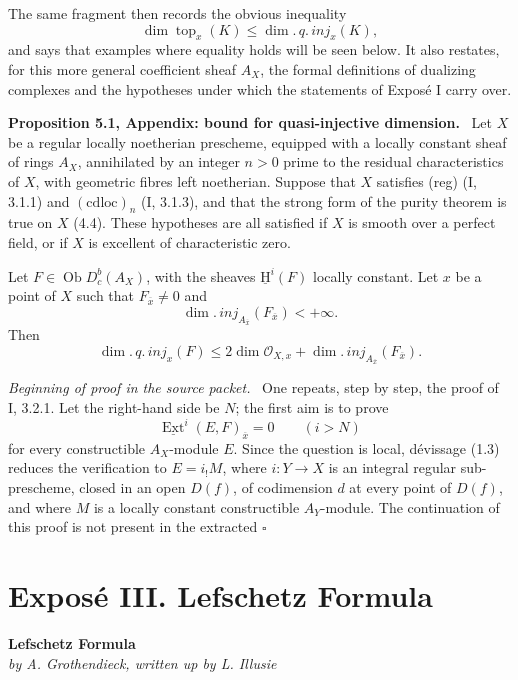 \documentclass[12pt]{article}
\newcommand{\Ext}{\operatorname{Ext}}
\newcommand{\ob}{\operatorname{Ob}}
\newcommand{\cO}{\mathcal O}
\newcommand{\ol}[1]{\overline{#1}}
\newcommand{\uH}{\underline{\mathrm H}}
\newcommand{\uExt}{\underline{\Ext}}
\newcommand{\qedtext}{\hfill$\square$}
\newenvironment{statement}[1]{\par\medskip\noindent\textbf{#1.}\ }{\par\medskip}
\newenvironment{prooftext}[1][Proof]{\par\noindent\emph{#1.}\ }{\par\medskip}
\begin{document}
The same fragment then records the obvious inequality
\[
   \dim\operatorname{top}_x(K)\le \dim.\,q.\,inj_x(K),
\]
and says that examples where equality holds will be seen below. It also restates, for this more general coefficient sheaf $A_X$, the formal definitions of dualizing complexes and the hypotheses under which the statements of Exposé I carry over.

\begin{statement}{Proposition 5.1, Appendix: bound for quasi-injective dimension}
Let $X$ be a regular locally noetherian prescheme, equipped with a locally constant sheaf of rings $A_X$, annihilated by an integer $n>0$ prime to the residual characteristics of $X$, with geometric fibres left noetherian. Suppose that $X$ satisfies (reg) (I, 3.1.1) and $(\mathrm{cdloc})_n$ (I, 3.1.3), and that the strong form of the purity theorem is true on $X$ (4.4). These hypotheses are all satisfied if $X$ is smooth over a perfect field, or if $X$ is excellent of characteristic zero.

Let $F\in\ob D_c^b(A_X)$, with the sheaves $\uH^i(F)$ locally constant. Let $x$ be a point of $X$ such that $F_{\ol x}\ne0$ and
\[
   \dim.\,inj_{A_{\ol x}}(F_{\ol x})<+\infty.
\]
Then
\[
   \dim.\,q.\,inj_x(F)
      \le 2\dim\cO_{X,x}+\dim.\,inj_{A_{\ol x}}(F_{\ol x}).
\]
\end{statement}

\begin{prooftext}[Beginning of proof in the source packet]
One repeats, step by step, the proof of I, 3.2.1. Let the right-hand side be $N$; the first aim is to prove
\[
   \uExt^i(E,F)_{\ol x}=0
      \qquad(i>N)
\]
for every constructible $A_X$-module $E$. Since the question is local, dévissage (1.3) reduces the verification to $E=i_!M$, where $i:Y\to X$ is an integral regular sub-prescheme, closed in an open $D(f)$, of codimension $d$ at every point of $D(f)$, and where $M$ is a locally constant constructible $A_Y$-module. The continuation of this proof is not present in the extracted  \qedtext
\end{prooftext}

\section*{Exposé III. Lefschetz Formula}

\begin{center}
\textbf{Lefschetz Formula}\\
\emph{by A. Grothendieck, written up by L. Illusie}
\end{center}
\end{document}
